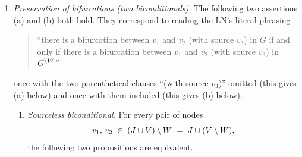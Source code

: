 \documentclass[main]{subfiles}
\begin{document}
\begin{Rem}[MargPreservesAncestors]
\begin{enumerate}[label=\roman*.)]
        \item \label{rem:marg_preserves_bifurcations}
            \emph{Preservation of bifurcations (two biconditionals).}
            The following two assertions (a) and (b) both hold. They correspond to reading the LN's literal phrasing
            \begin{quote}
                ``there is a bifurcation between $v_1$ and $v_2$ (with source $v_3$) in $G$ if and only if there is a bifurcation between $v_1$ and $v_2$ (with source $v_3$) in $G^{\setminus W}$''
            \end{quote}
            once with the two parenthetical clauses ``(with source $v_3$)'' omitted (this gives (a) below) and once with them included (this gives (b) below).

            \begin{enumerate}[label=(\alph*)]
                \item \emph{Sourceless biconditional.}
                    For every pair of nodes
                    \[
                        v_1,\, v_2 \;\in\; (J \cup V) \setminus W \;=\; J \cup (V \setminus W),
                    \]
                    the following two propositions are equivalent.


\end{enumerate}
\end{enumerate}
\end{Rem}
\end{document}
